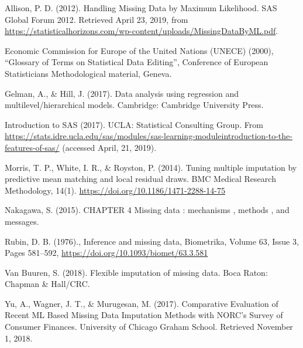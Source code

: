 \documentclass[12pt,oneside]{chicagocapstone}
\begin{document}
Allison, P. D. (2012). Handling Missing Data by Maximum Likelihood. SAS
Global Forum 2012. Retrieved April 23, 2019, from\\
\url{https://statisticalhorizons.com/wp-content/uploads/MissingDataByML.pdf}.

Economic Commission for Europe of the United Nations (UNECE) (2000),
``Glossary of Terms on Statistical Data Editing'', Conference of
European Statisticians Methodological material, Geneva.

Gelman, A., \& Hill, J. (2017). Data analysis using regression and
multilevel/hierarchical models. Cambridge: Cambridge University Press.

Introduction to SAS (2017). UCLA: Statistical Consulting Group. From
\url{https://stats.idre.ucla.edu/sas/modules/sas-learning-moduleintroduction-to-the-features-of-sas/}
(accessed April, 21, 2019).

Morris, T. P., White, I. R., \& Royston, P. (2014). Tuning multiple
imputation by predictive mean matching and local residual draws. BMC
Medical Research Methodology, 14(1).
\url{https://doi.org/10.1186/1471-2288-14-75}

Nakagawa, S. (2015). CHAPTER 4 Missing data : mechanisms , methods , and
messages.

Rubin, D. B. (1976)., Inference and missing data, Biometrika, Volume 63,
Issue 3, Pages 581--592, \url{https://doi.org/10.1093/biomet/63.3.581}

Van Buuren, S. (2018). Flexible imputation of missing data. Boca Raton:
Chapman \& Hall/CRC.

Yu, A., Wagner, J. T., \& Murugesan, M. (2017). Comparative Evaluation
of Recent ML Based Missing Data Imputation Methods with NORC's Survey of
Consumer Finances. University of Chicago Graham School. Retrieved
November 1, 2018.


\end{document}
